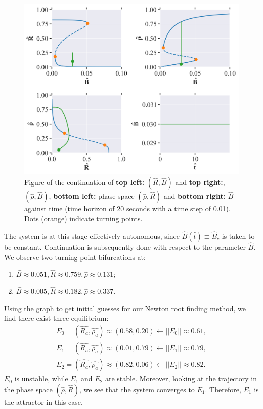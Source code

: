 \begin{figure}[H]
    \centering
    \includegraphics[width= \textwidth]{figures/cell_biology_R0=0.3_rho0=0.16_deltaR=1_n=4_Bmax=0.04_eps=0.0.png}
    \caption{Figure of the continuation of \textbf{top left:} $(\hat{R}, \hat{B})$ and \textbf{top right:}, $(\hat{\rho}, \hat{B})$, \textbf{bottom left:} phase space $(\hat{\rho}, \hat{R})$ and 
    \textbf{bottom right:} $\hat{B}$ against time (time horizon of 20 seconds with a time step of 0.01). Dots (orange) indicate turning points.}
    \label{fig:cell_biology_ex1}
\end{figure}

The system is at this stage effectively autonomous, since $\hat{B}(\hat{t}) \equiv \hat{B}_c$ is taken to be constant. Continuation is subsequently done with respect to the parameter $\hat{B}$. We observe two turning point bifurcations at:
\begin{enumerate}
    \item $\hat{B} \approx 0.051, \hat{R}\approx0.759, \hat{\rho}\approx0.131$; 
    \item $\hat{B} \approx 0.005, \hat{R}\approx0.182, \hat{\rho}\approx0.337$.
\end{enumerate}

Using the graph to get initial guesses for our Newton root finding method, we find there exist three equilibrium:
\begin{align*}
    E_0=(\hat{R_a}, \hat{\rho_a}) \approx (0.58,0.20) \leftarrow ||E_0|| \approx 0.61, \\
    E_1=(\hat{R_a}, \hat{\rho_a}) \approx (0.01,0.79) \leftarrow ||E_1|| \approx 0.79, \\
    E_2=(\hat{R_a}, \hat{\rho_a}) \approx (0.82,0.06) \leftarrow ||E_2|| \approx 0.82.
\end{align*}
$E_0$ is unstable, while $E_1$ and $E_2$ are stable. Moreover, looking at the trajectory in the phase space $(\hat{\rho}, \hat{R})$, we see that the system converges to $E_1$. 
Therefore, $E_1$ is the attractor in this case.

